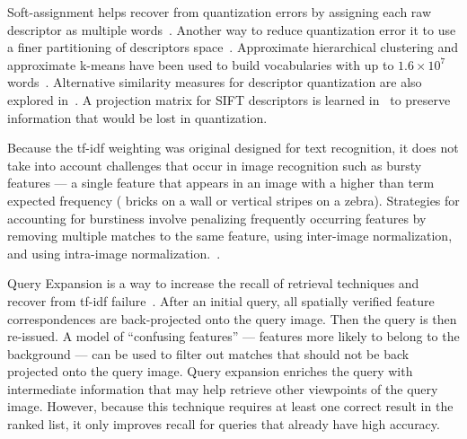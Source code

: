             Soft-assignment helps recover from quantization errors by assigning each raw descriptor as multiple
            words~\cite{philbin_lost_2008}. Another way to reduce quantization error it to use a finer partitioning of
            descriptors space~\cite{philbin_object_2007}. Approximate hierarchical clustering and approximate k-means
            have been used to build vocabularies with up to $1.6 \times 10^7$ words~\cite{nister_scalable_2006,
            philbin_object_2007, mikulik_learning_2010}. Alternative similarity measures for descriptor quantization are
            also explored in~\cite{mikulik_learning_2010}.
            A projection matrix for SIFT descriptors is learned in~\cite{philbin_descriptor_2010} to preserve
            information that would be lost in quantization.

            Because the tf-idf weighting was original designed for text recognition, it does not take into account
            challenges that occur in image recognition such as bursty features --- a single feature that appears in an
            image with a higher than term expected frequency (\eg{} bricks on a wall or vertical stripes on a zebra).
            Strategies for accounting for burstiness involve penalizing frequently occurring features by removing
            multiple matches to the same feature, using inter-image normalization, and using intra-image
            normalization.~\cite{jegou_burstiness_2009}.
            
            Query Expansion is a way to increase the recall of retrieval techniques and recover from tf-idf
            failure~\cite{chum_total_2007, chum_total_2011, arandjelovic_three_2012, tolias_visual_2014}. After an
            initial query, all spatially verified feature correspondences are back-projected onto the query image. Then
            the query is then re-issued. A model of ``confusing features'' --- features more likely to belong to the
            background --- can be used to filter out matches that should not be back projected onto the query image.
            Query expansion enriches the query with intermediate information that may help retrieve other viewpoints of
            the query image. However, because this technique requires at least one correct result in the ranked list, it
            only improves recall for queries that already have high accuracy.


